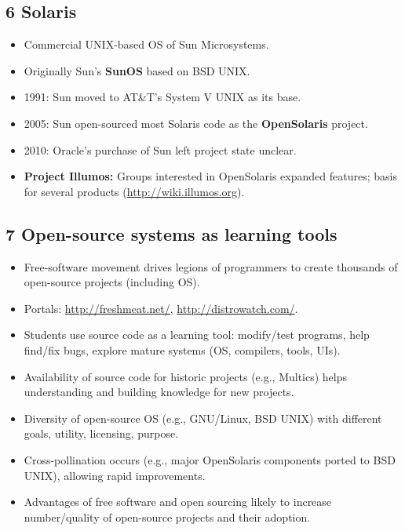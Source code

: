 \documentclass{article}
\begin{document}
\subsection*{6 Solaris}
\begin{itemize}
    \item Commercial UNIX-based OS of Sun Microsystems.
    \item Originally Sun's \textbf{SunOS} based on BSD UNIX.
    \item 1991: Sun moved to AT\&T's System V UNIX as its base.
    \item 2005: Sun open-sourced most Solaris code as the \textbf{OpenSolaris} project.
    \item 2010: Oracle's purchase of Sun left project state unclear.
    \item \textbf{Project Illumos:} Groups interested in OpenSolaris expanded features; basis for several products (\url{http://wiki.illumos.org}).
\end{itemize}

\subsection*{7 Open-source systems as learning tools}
\begin{itemize}
    \item Free-software movement drives legions of programmers to create thousands of open-source projects (including OS).
    \item Portals: \url{http://freshmeat.net/}, \url{http://distrowatch.com/}.
    \item Students use source code as a learning tool: modify/test programs, help find/fix bugs, explore mature systems (OS, compilers, tools, UIs).
    \item Availability of source code for historic projects (e.g., Multics) helps understanding and building knowledge for new projects.
    \item Diversity of open-source OS (e.g., GNU/Linux, BSD UNIX) with different goals, utility, licensing, purpose.
    \item Cross-pollination occurs (e.g., major OpenSolaris components ported to BSD UNIX), allowing rapid improvements.
    \item Advantages of free software and open sourcing likely to increase number/quality of open-source projects and their adoption.
\end{itemize}
\end{document}

